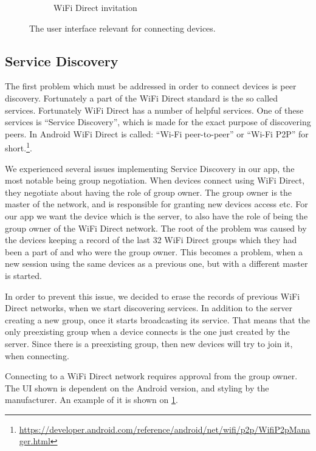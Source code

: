 \begin{figure}[ht]
\begin{subfigure}[b]{0.33\linewidth}
    \caption{WiFi Direct invitation}
    \label{fig:wifidirectinv}
    \vspace{4ex}
  \end{subfigure}
  \caption{The user interface relevant for connecting devices.}
  \label{fig:connecting}
\end{figure}

\subsection{Service Discovery}

The first problem which must be addressed in order to connect devices is peer discovery.
Fortunately a part of the WiFi Direct standard is the so called services.
Fortunately WiFi Direct has a number of helpful services.
One of these services is ``Service Discovery'', which is made for the exact purpose of discovering peers.
In Android WiFi Direct is called: ``Wi-Fi peer-to-peer'' or ``Wi-Fi P2P'' for short.\footnote{\url{https://developer.android.com/reference/android/net/wifi/p2p/WifiP2pManager.html}}.

We experienced several issues implementing Service Discovery in our app, the most notable being group negotiation.
When devices connect using WiFi Direct, they negotiate about having the role of group owner.
The group owner is the master of the network, and is responsible for granting new devices access etc.
For our app we want the device which is the server, to also have the role of being the group owner of the WiFi Direct network.
The root of the problem was caused by the devices keeping a record of the last 32 WiFi Direct groups which they had been a part of and who were the group owner.
This becomes a problem, when a new session using the same devices as a previous one, but with a different master is started.

In order to prevent this issue, we decided to erase the records of previous WiFi Direct networks, when we start discovering services.
In addition to the server creating a new group, once it starts broadcasting its service.
That means that the only preexisting group when a device connects is the one just created by the server.
Since there is a preexisting group, then new devices will try to join it, when connecting.

Connecting to a WiFi Direct network requires approval from the group owner.
The UI shown is dependent on the Android version, and styling by the manufacturer.
An example of it is shown on \cref{fig:wifidirectinv}.

